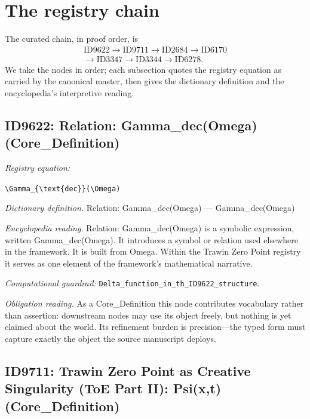 \documentclass[11pt]{article}
\theoremstyle{remark}
\begin{document}
\section{The registry chain}
\label{sec:chain}

The curated chain, in proof order, is
\begin{equation*}
\begin{gathered}
\text{ID9622} \to \text{ID9711} \to \text{ID2684} \to \text{ID6170} \\
\to \text{ID3347} \to \text{ID3344} \to \text{ID6278}.
\end{gathered}
\end{equation*}
We take the nodes in order; each subsection quotes the registry equation as carried by the canonical master, then gives the dictionary definition and the encyclopedia's interpretive reading.

\subsection{ID9622: Relation: Gamma\_dec(Omega) (Core\_Definition)}

\noindent\textit{Registry equation:}\par
{\small\texttt{\textbackslash{}Gamma\_\{\textbackslash{}text\{dec\}\}(\textbackslash{}Omega)}}\par\medskip
\noindent\textit{Dictionary definition.} Relation: Gamma\_dec(Omega) --- Gamma\_dec(Omega)\par\medskip
\noindent\textit{Encyclopedia reading.} Relation: Gamma\_dec(Omega) is a symbolic expression, written Gamma\_dec(Omega). It introduces a symbol or relation used elsewhere in the framework. It is built from Omega. Within the Trawin Zero Point registry it serves as one element of the framework's mathematical narrative.
\par\medskip\noindent\textit{Computational guardrail:} \texttt{Delta\_function\_in\_th\_ID9622\_structure}.
\par\medskip\noindent\textit{Obligation reading.} As a Core\_Definition this node contributes vocabulary rather than assertion: downstream nodes may use its object freely, but nothing is yet claimed about the world. Its refinement burden is precision---the typed form must capture exactly the object the source manuscript deploys.

\subsection{ID9711: Trawin Zero Point as Creative Singularity (ToE Part II): Psi(x,t) (Core\_Definition)}
\end{document}

